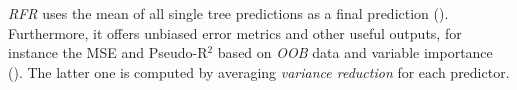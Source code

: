 \documentclass[a4paper,reqno,]{article}
\begin{document}
\textit{RFR} uses the mean of all single tree predictions as a final prediction (\cite{rf_wiki}).   
Furthermore, it offers unbiased error metrics and other useful outputs, for instance the MSE and Pseudo-R$^{2}$ based on \textit{OOB} data and variable importance (\cite{rf_manual}). 
The latter one is computed by averaging \textit{variance reduction} for each predictor. %
\\
\\
\newpage
\end{document}
